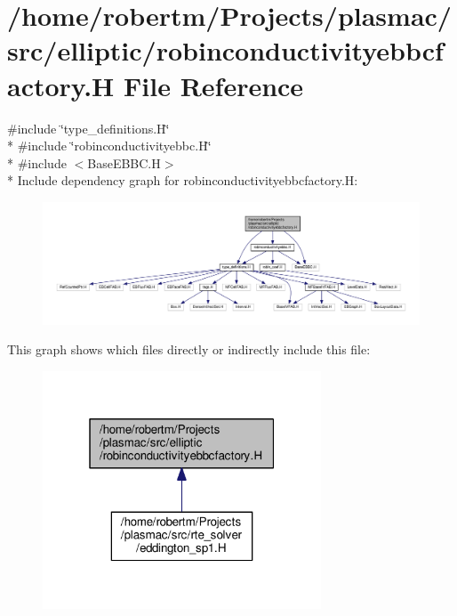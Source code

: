 \hypertarget{robinconductivityebbcfactory_8H}{}\section{/home/robertm/\+Projects/plasmac/src/elliptic/robinconductivityebbcfactory.H File Reference}
\label{robinconductivityebbcfactory_8H}
{\ttfamily \#include \char`\"{}type\+\_\+definitions.\+H\char`\"{}}\\*
{\ttfamily \#include \char`\"{}robinconductivityebbc.\+H\char`\"{}}\\*
{\ttfamily \#include $<$Base\+E\+B\+B\+C.\+H$>$}\\*
Include dependency graph for robinconductivityebbcfactory.\+H\+:\nopagebreak
\begin{figure}[H]
\begin{center}
\leavevmode
\includegraphics[width=350pt]{robinconductivityebbcfactory_8H__incl}
\end{center}
\end{figure}
This graph shows which files directly or indirectly include this file\+:\nopagebreak
\begin{figure}[H]
\begin{center}
\leavevmode
\includegraphics[width=235pt]{robinconductivityebbcfactory_8H__dep__incl}
\end{center}
\end{figure}
